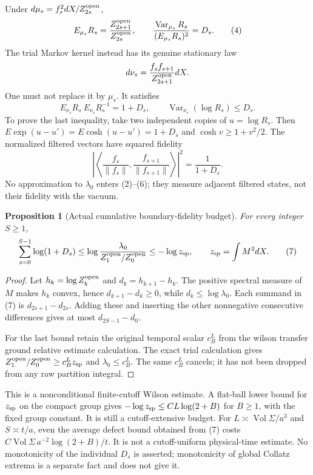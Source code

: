 \documentclass[11pt]{article}
\newtheorem{proposition}{Proposition}
\begin{document}
Under $d\mu_s=f_s^2dX/Z_{2s}^{\rm open}$,
\[
 E_{\mu_s}R_s=\frac{Z_{2s+1}^{\rm open}}{Z_{2s}^{\rm open}},\qquad
 \frac{\operatorname{Var}_{\mu_s}R_s}{(E_{\mu_s}R_s)^2}=D_s.       \tag{4}
\]
The trial Markov kernel instead has its genuine stationary law
\[
 d\nu_s=\frac{f_sf_{s+1}}{Z_{2s+1}^{\rm open}}dX.
\]
One must not replace it by $\mu_s$. It satisfies
\[
 E_{\nu_s}R_s\ E_{\nu_s}R_s^{-1}=1+D_s,
 \qquad \operatorname{Var}_{\nu_s}(\log R_s)\le D_s.    \tag{5}
\]
To prove the last inequality, take two independent copies of $u=\log R_s$.
Then $E\exp(u-u')=E\cosh(u-u')=1+D_s$ and
$\cosh v\ge1+v^2/2$. The normalized filtered vectors have squared fidelity
\[
 \left|\left\langle\frac{f_s}{\|f_s\|},
                \frac{f_{s+1}}{\|f_{s+1}\|}\right\rangle\right|^2
       =\frac1{1+D_s}.                                \tag{6}
\]
No approximation to $\lambda_0$ enters (2)--(6); they measure adjacent filtered
states, not their fidelity with the vacuum.

\begin{proposition}[Actual cumulative boundary-fidelity budget]
For every integer $S\ge1$,
\[
 \sum_{s=0}^{S-1}\log(1+D_s)
 \le\log\frac{\lambda_0}{Z_1^{\rm open}/Z_0^{\rm open}}
 \le-\log z_{\rm sp},\qquad z_{\rm sp}=\int M^2dX.    \tag{7}
\]
\end{proposition}
\begin{proof}
Let $h_k=\log Z_k^{\rm open}$ and $d_k=h_{k+1}-h_k$.
The positive spectral measure of $M$ makes $h_k$ convex, hence
$d_{k+1}-d_k\ge0$, while $d_k\le\log\lambda_0$.
Each summand in (7) is $d_{2s+1}-d_{2s}$. Adding these and inserting the other
nonnegative consecutive differences gives at most $d_{2S-1}-d_0$.

For the last bound retain the original temporal scalar $c_B^L$ from the wilson transfer ground relative estimate calculation.
The exact trial calculation gives
$Z_1^{\rm open}/Z_0^{\rm open}\ge c_B^L z_{\rm sp}$ and
$\lambda_0\le c_B^L$. The same $c_B^L$ cancels; it has not been dropped from
any raw partition integral.
\end{proof}

This is a nonconditional finite-cutoff Wilson estimate. A flat-ball lower bound
for $z_{\rm sp}$ on the compact group gives
$-\log z_{\rm sp}\le C L\log(2+B)$ for $B\ge1$, with the fixed group constant.
It is still a cutoff-extensive budget. For $L\asymp\operatorname{Vol}\Sigma/a^3$
and $S\asymp t/a$, even the average defect bound obtained from (7) costs
$C\operatorname{Vol}\Sigma\,a^{-2}\log(2+B)/t$.
It is not a cutoff-uniform physical-time estimate. No monotonicity of the
individual $D_s$ is asserted; monotonicity of global Collatz extrema is a separate
fact and does not give it.
\end{document}
